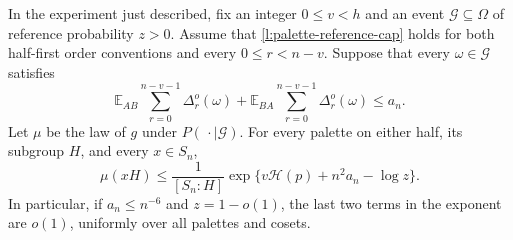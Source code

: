 \begin{lemma}
\label{l:palette-information}
In the experiment just described, fix an integer $0\le v<h$ and an event
$\mathcal G\subseteq\Omega$ of reference probability $z>0$.
Assume that \eqref{l:palette-reference-cap} holds for both half-first
order conventions and every $0\le r<n-v$.  Suppose that every
$\omega\in\mathcal G$ satisfies
\begin{equation}
 \mathbb E_{AB}\sum_{r=0}^{n-v-1}\Delta_r^o(\omega)
 +\mathbb E_{BA}\sum_{r=0}^{n-v-1}\Delta_r^o(\omega)
 \le a_n.
 \label{l:palette-retained-cap}
\end{equation}
Let $\mu$ be the law of $g$ under $P(\,\cdot\mid\mathcal G)$.
For every palette on either half, its subgroup $H$, and every $x\in S_n$,
\begin{equation}
 \mu(xH)\le \frac{1}{[S_n:H]}
       \exp\{v\mathcal H(p)+n^2a_n-\log z\}.
 \label{l:palette-information-cap}
\end{equation}
In particular, if $a_n\le n^{-6}$ and $z=1-o(1)$, the last two terms
in the exponent are $o(1)$, uniformly over all palettes and cosets.
\end{lemma}

